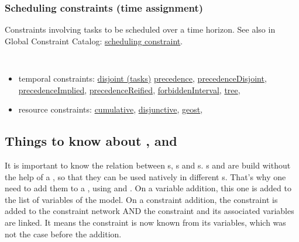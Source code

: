 \subsubsection{Scheduling constraints (time assignment)}\label{model:schedulingconstraints}\hypertarget{model:schedulingconstraints}{}
Constraints involving tasks to be scheduled over a time horizon.
See also in Global Constraint Catalog: \href{http://www.emn.fr/x-info/sdemasse/gccat/Kscheduling_constraint.html}{scheduling constraint}.

\vspace{1em}\noindent\begin{notedef}\tt
   \begin{itemize}
   \item temporal constraints:
\hyperlink{disjoint}{disjoint (tasks)} 
\hyperlink{precedence:precedenceconstraint}{precedence}, 
\hyperlink{precedencedisjoint:precedencedisjointconstraint}{precedenceDisjoint}, 
\hyperlink{precedenceimplied:precedenceimpliedconstraint}{precedenceImplied}, 
\hyperlink{precedencereified:precedencereifiedconstraint}{precedenceReified},
\hyperlink{forbiddeninterval:forbiddenintervalconstraint}{forbiddenInterval},
\hyperlink{tree:treeconstraint}{tree},
   \item resource constraints: 
\hyperlink{cumulative:cumulativeconstraint}{cumulative}, 
\hyperlink{disjunctive:disjunctiveconstraint}{disjunctive}, 
\hyperlink{geost:geostconstraint}{geost}, 
 \end{itemize}
\end{notedef}

\subsection{Things to know about ,  and }

It is important to know the relation between s, s and s. s and  are build without the help of a , so that they can be used natively in different s. That's why one need to add them to a , using  and . On a variable addition, this one is added to the list of variables of the model. On a constraint addition, the constraint is added to the constraint network AND the constraint and its associated variables are linked. It means the constraint is now known from its variables, which was not the case before the addition.


